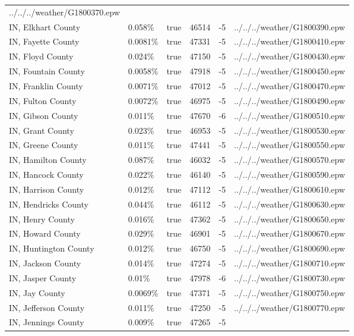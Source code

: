 \begin{longtable}[]{@{}llllll@{}}
../../../weather/G1800370.epw \\
IN, Elkhart County & 0.058\% & true & 46514 & -5 &
../../../weather/G1800390.epw \\
IN, Fayette County & 0.0081\% & true & 47331 & -5 &
../../../weather/G1800410.epw \\
IN, Floyd County & 0.024\% & true & 47150 & -5 &
../../../weather/G1800430.epw \\
IN, Fountain County & 0.0058\% & true & 47918 & -5 &
../../../weather/G1800450.epw \\
IN, Franklin County & 0.0071\% & true & 47012 & -5 &
../../../weather/G1800470.epw \\
IN, Fulton County & 0.0072\% & true & 46975 & -5 &
../../../weather/G1800490.epw \\
IN, Gibson County & 0.011\% & true & 47670 & -6 &
../../../weather/G1800510.epw \\
IN, Grant County & 0.023\% & true & 46953 & -5 &
../../../weather/G1800530.epw \\
IN, Greene County & 0.011\% & true & 47441 & -5 &
../../../weather/G1800550.epw \\
IN, Hamilton County & 0.087\% & true & 46032 & -5 &
../../../weather/G1800570.epw \\
IN, Hancock County & 0.022\% & true & 46140 & -5 &
../../../weather/G1800590.epw \\
IN, Harrison County & 0.012\% & true & 47112 & -5 &
../../../weather/G1800610.epw \\
IN, Hendricks County & 0.044\% & true & 46112 & -5 &
../../../weather/G1800630.epw \\
IN, Henry County & 0.016\% & true & 47362 & -5 &
../../../weather/G1800650.epw \\
IN, Howard County & 0.029\% & true & 46901 & -5 &
../../../weather/G1800670.epw \\
IN, Huntington County & 0.012\% & true & 46750 & -5 &
../../../weather/G1800690.epw \\
IN, Jackson County & 0.014\% & true & 47274 & -5 &
../../../weather/G1800710.epw \\
IN, Jasper County & 0.01\% & true & 47978 & -6 &
../../../weather/G1800730.epw \\
IN, Jay County & 0.0069\% & true & 47371 & -5 &
../../../weather/G1800750.epw \\
IN, Jefferson County & 0.011\% & true & 47250 & -5 &
../../../weather/G1800770.epw \\
IN, Jennings County & 0.009\% & true & 47265 & -5 &

\end{longtable}
